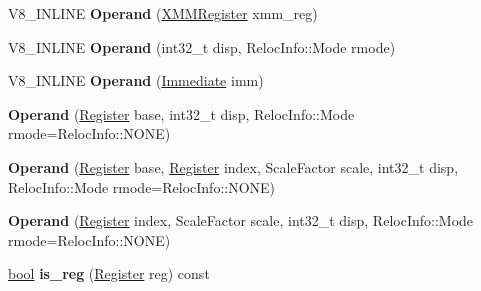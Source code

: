 \begin{DoxyCompactItemize}
\item 
\mbox{\label{classv8_1_1internal_1_1Operand_a84297f7ec7218c893e6dfa211a00cff3}} 
V8\+\_\+\+I\+N\+L\+I\+NE {\bfseries Operand} (\mbox{\hyperlink{classv8_1_1internal_1_1XMMRegister}{X\+M\+M\+Register}} xmm\+\_\+reg)
\item 
\mbox{\label{classv8_1_1internal_1_1Operand_ac94fc71d788656430bb8842069e545ff}} 
V8\+\_\+\+I\+N\+L\+I\+NE {\bfseries Operand} (int32\+\_\+t disp, Reloc\+Info\+::\+Mode rmode)
\item 
\mbox{\label{classv8_1_1internal_1_1Operand_a20cd972fc6de3b9510a19f1ca02926dd}} 
V8\+\_\+\+I\+N\+L\+I\+NE {\bfseries Operand} (\mbox{\hyperlink{classv8_1_1internal_1_1Immediate}{Immediate}} imm)
\item 
\mbox{\label{classv8_1_1internal_1_1Operand_a10bd5cc68f71fe0dfae7063f78e11bfb}} 
{\bfseries Operand} (\mbox{\hyperlink{classv8_1_1internal_1_1Register}{Register}} base, int32\+\_\+t disp, Reloc\+Info\+::\+Mode rmode=Reloc\+Info\+::\+N\+O\+NE)
\item 
\mbox{\label{classv8_1_1internal_1_1Operand_aaeabdf39a1861fc1151ca8eeb0c16a2a}} 
{\bfseries Operand} (\mbox{\hyperlink{classv8_1_1internal_1_1Register}{Register}} base, \mbox{\hyperlink{classv8_1_1internal_1_1Register}{Register}} index, Scale\+Factor scale, int32\+\_\+t disp, Reloc\+Info\+::\+Mode rmode=Reloc\+Info\+::\+N\+O\+NE)
\item 
\mbox{\label{classv8_1_1internal_1_1Operand_ad52280f518ff1c4219e902eab58239e2}} 
{\bfseries Operand} (\mbox{\hyperlink{classv8_1_1internal_1_1Register}{Register}} index, Scale\+Factor scale, int32\+\_\+t disp, Reloc\+Info\+::\+Mode rmode=Reloc\+Info\+::\+N\+O\+NE)
\item 
\mbox{\label{classv8_1_1internal_1_1Operand_a02ed862022e9d0e210c25cadd648ad4e}} 
\mbox{\hyperlink{classbool}{bool}} {\bfseries is\+\_\+reg} (\mbox{\hyperlink{classv8_1_1internal_1_1Register}{Register}} reg) const
\item 
\mbox{\label{classv8_1_1internal_1_1Operand_a48b18c673800ad1fbd39246d727c1d7f}} 

\end{DoxyCompactItemize}
